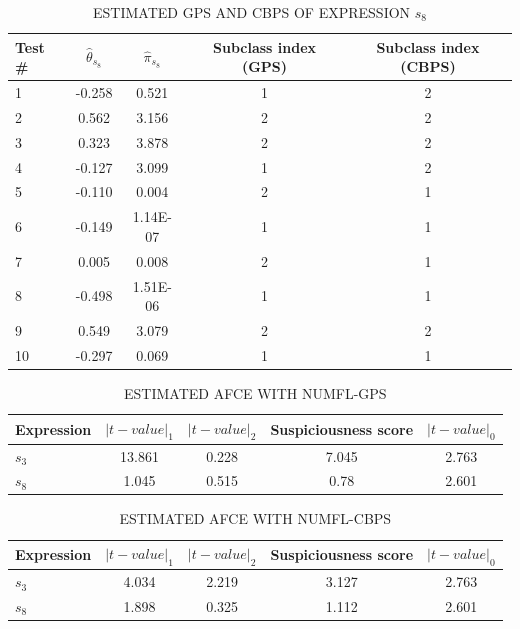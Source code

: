 \documentclass[times]{stvrauth}
\begin{document}
\begin{table}[htbp!]
\caption{ESTIMATED GPS AND CBPS OF EXPRESSION $s_8$}
\label{exampledata4}
\centering
      \begin{tabular}{|l|c|c|c|c|}
      \hline
Test \#	&	${\hat{\theta}}_{s_8}$	&	${\hat{\pi}}_{s_8}$	&	Subclass index (GPS)	&	Subclass index (CBPS)	\\ \hline
1	&	-0.258	&	0.521	&	1	&	2	\\ \hline
2	&	0.562	&	3.156	&	2	&	2	\\ \hline
3	&	0.323	&	3.878	&	2	&	2	\\ \hline
4	&	-0.127	&	3.099	&	1	&	2	\\ \hline
5	&	-0.110	&	0.004	&	2	&	1	\\ \hline
6	&	-0.149	&	1.14E-07	&	1	&	1	\\ \hline
7	&	0.005	&	0.008	&	2	&	1	\\ \hline
8	&	-0.498	&	1.51E-06	&	1	&	1	\\ \hline
9	&	0.549	&	3.079	&	2	&	2	\\ \hline
10	&	-0.297	&	0.069	&	1	&	1	\\ \hline
\end{tabular}
\end{table}

\begin{table}[htbp!]
\caption{ESTIMATED AFCE WITH NUMFL-GPS}
\label{exampledata5}
\centering
      \begin{tabular}{|l|c|c|c|c|}
      \hline
Expression& ${|t-value|}_1$  & ${|t-value|}_2$ & Suspiciousness score & ${|t-value|}_0$\\	\hline

$s_3$ &  13.861 &0.228 &7.045 &2.763 \\	\hline
$s_8$& 1.045 &0.515 &0.78 &2.601\\	\hline
\end{tabular}
\end{table}

\begin{table}[htbp!]
\caption{ESTIMATED AFCE WITH NUMFL-CBPS}
\label{exampledata6}
\centering
      \begin{tabular}{|l|c|c|c|c|}
      \hline
Expression& ${|t-value|}_1$  & ${|t-value|}_2$  & Suspiciousness score & ${|t-value|}_0$\\	\hline
$s_3$ &  4.034 &2.219 &3.127 &2.763\\	\hline
$s_8$& 1.898&0.325 &1.112 &2.601\\	\hline
\end{tabular}
\end{table}
\end{document}
